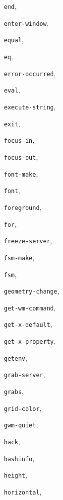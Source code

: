 \begin{theindex}
\item {\tt end}, {\bf\pageref{end}}
\item {\tt enter-window}, {\bf\pageref{enter-window}}
\item {\tt equal}, {\bf\pageref{equal}}
\item {\tt eq}, {\bf\pageref{eq}}
\item {\tt error-occurred}, {\bf\pageref{error-occurred}}
\item {\tt eval}, {\bf\pageref{eval}}
\item {\tt execute-string}, {\bf\pageref{execute-string}}
\item {\tt exit}, {\bf\pageref{exit}}
\item {\tt focus-in}, {\bf\pageref{focus-in}}
\item {\tt focus-out}, {\bf\pageref{focus-out}}
\item {\tt font-make}, {\bf\pageref{font-make}}
\item {\tt font}, {\bf\pageref{font}}
\item {\tt foreground}, {\bf\pageref{foreground}}
\item {\tt for}, {\bf\pageref{for}}
\item {\tt freeze-server}, {\bf\pageref{freeze-server}}
\item {\tt fsm-make}, {\bf\pageref{fsm-make}}
\item {\tt fsm}, {\bf\pageref{fsm}}
\item {\tt geometry-change}, {\bf\pageref{geometry-change}}
\item {\tt get-wm-command}, {\bf\pageref{get-wm-command}}
\item {\tt get-x-default}, {\bf\pageref{get-x-default}}
\item {\tt get-x-property}, {\bf\pageref{get-x-property}}
\item {\tt getenv}, {\bf\pageref{getenv}}
\item {\tt grab-server}, {\bf\pageref{grab-server}}
\item {\tt grabs}, {\bf\pageref{grabs}}
\item {\tt grid-color}, {\bf\pageref{grid-color}}
\item {\tt gwm-quiet}, {\bf\pageref{gwm-quiet}}
\item {\tt hack}, {\bf\pageref{hack}}
\item {\tt hashinfo}, {\bf\pageref{hashinfo}}
\item {\tt height}, {\bf\pageref{height}}
\item {\tt horizontal}, {\bf\pageref{horizontal}}

\end{theindex}

